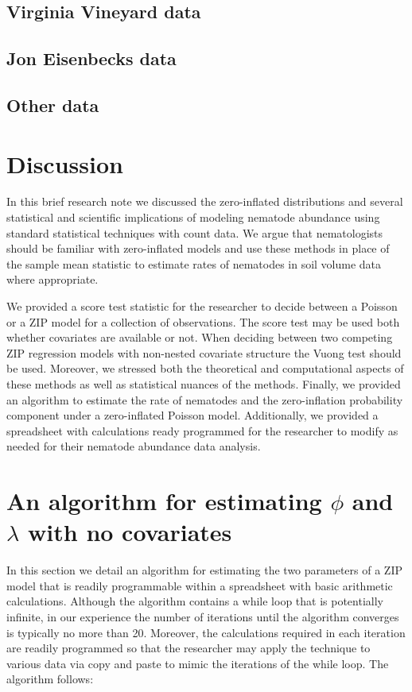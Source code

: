 \documentclass{article}
\begin{document}
\subsection{Virginia Vineyard data}

\subsection{Jon Eisenbecks data}

\subsection{Other data}


\section{Discussion}\label{sec:disc}
In this brief research note we discussed the zero-inflated distributions and several statistical and scientific implications of modeling nematode abundance using standard statistical techniques with count data. We argue that nematologists should be familiar with zero-inflated models and use these methods in place of the sample mean statistic to estimate rates of nematodes in soil volume data where appropriate. 

We provided a score test statistic for the researcher to decide between a Poisson or a ZIP model for a collection of observations. The score test may be used both whether covariates are available or not. When deciding between two competing ZIP regression models with non-nested covariate structure the Vuong test should be used. Moreover, we stressed both the theoretical and computational aspects of these methods as well as statistical nuances of the methods. Finally, we provided an algorithm to estimate the rate of nematodes and the zero-inflation probability component under a zero-inflated Poisson model. Additionally, we provided a spreadsheet with calculations ready programmed for the researcher 
to modify as needed for their nematode abundance data analysis.

\appendix 
\section{An algorithm for estimating $\phi$ and $\lambda$ with no covariates}\label{sec:algo}

In this section we detail an algorithm for estimating the two parameters of a ZIP model that is readily programmable within a spreadsheet with basic arithmetic calculations. Although the algorithm contains a while loop that is potentially infinite, in our experience the number of iterations until the algorithm converges is typically no more than 20. Moreover, the calculations required in each iteration are readily programmed so that the researcher may apply the technique to various data via copy and paste to mimic the iterations of the while loop. The algorithm follows: 
\end{document}
